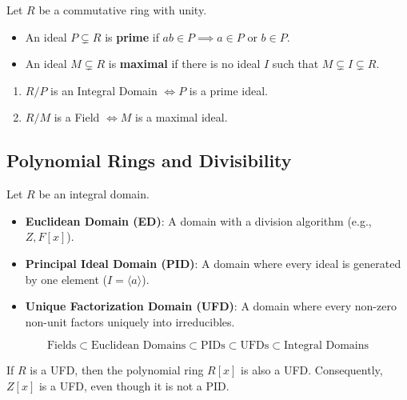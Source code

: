 \begin{definition}
Let $R$ be a commutative ring with unity.
\begin{itemize}
    \item An ideal $P \subsetneq R$ is \textbf{prime} if $ab \in P \implies a \in P$ or $b \in P$.
    \item An ideal $M \subsetneq R$ is \textbf{maximal} if there is no ideal $I$ such that $M \subsetneq I \subsetneq R$.
\end{itemize}
\end{definition}

\begin{theorem}
\begin{enumerate}
    \item $R/P$ is an Integral Domain $\iff P$ is a prime ideal.
    \item $R/M$ is a Field $\iff M$ is a maximal ideal.
\end{enumerate}
\end{theorem}

\subsection{Polynomial Rings and Divisibility}

Let $R$ be an integral domain.
\begin{itemize}
    \item \textbf{Euclidean Domain (ED)}: A domain with a division algorithm (e.g., $Z, F[x]$).
    \item \textbf{Principal Ideal Domain (PID)}: A domain where every ideal is generated by one element ($I = \langle a \rangle$).
    \item \textbf{Unique Factorization Domain (UFD)}: A domain where every non-zero non-unit factors uniquely into irreducibles.
\end{itemize}

\begin{theorem}
\[ \text{Fields} \subset \text{Euclidean Domains} \subset \text{PIDs} \subset \text{UFDs} \subset \text{Integral Domains} \]
\end{theorem}

\begin{theorem}
If $R$ is a UFD, then the polynomial ring $R[x]$ is also a UFD. Consequently, $Z[x]$ is a UFD, even though it is not a PID.
\end{theorem}

